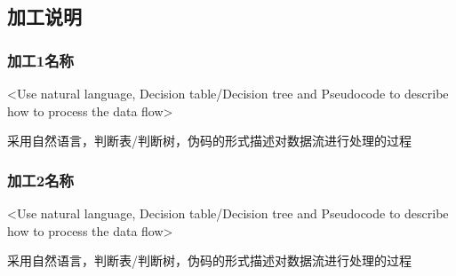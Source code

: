 \subsection{加工说明}
\subsubsection{加工1名称}
<Use natural language, Decision table/Decision tree and Pseudocode to describe how to process the data flow>

采用自然语言，判断表/判断树，伪码的形式描述对数据流进行处理的过程

\subsubsection{加工2名称}
<Use natural language, Decision table/Decision tree and Pseudocode to describe how to process the data flow>

采用自然语言，判断表/判断树，伪码的形式描述对数据流进行处理的过程
